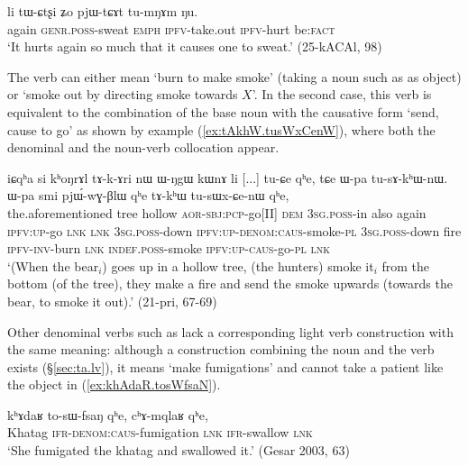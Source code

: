 \begin{exe}
\ex \label{ex:tWCtsxi.pjWtCAt}
 \gll  li tɯ-ɕtʂi ʑo pjɯ-tɕɤt tu-mŋɤm ŋu. \\
 again \textsc{genr}.\textsc{poss}-sweat \textsc{emph} \textsc{ipfv}-take.out \textsc{ipfv}-hurt be:\textsc{fact} \\
 \glt `It hurts again so much that it causes one to sweat.' (25-kACAl, 98)
\end{exe}
 
The verb  can either mean `burn to make smoke' (taking a noun such as  as object) or `smoke out by directing smoke towards $X$'. In the second case, this verb is equivalent to the combination of the base noun  with the causative form  `send, cause to go' as shown by example (\ref{ex:tAkhW.tusWxCenW}), where both the denominal  and the noun-verb collocation appear.

\begin{exe}
\ex \label{ex:tAkhW.tusWxCenW}
 \gll  iɕqʰa si kʰoŋrɤl tɤ-k-ɤri nɯ ɯ-ŋgɯ kɯnɤ li [...] tu-ɕe qʰe, tɕe ɯ-pa tu-sɤ-kʰɯ-nɯ. ɯ-pa smi pjɯ́-wɣ-βlɯ qʰe tɤ-kʰɯ tu-sɯx-ɕe-nɯ qʰe, \\
 the.aforementioned tree hollow \textsc{aor}-\textsc{sbj}:\textsc{pcp}-go[II] \textsc{dem} \textsc{3sg}.\textsc{poss}-in also again {  } \textsc{ipfv}:\textsc{up}-go \textsc{lnk} \textsc{lnk} \textsc{3sg}.\textsc{poss}-down \textsc{ipfv}:\textsc{up}-\textsc{denom}:\textsc{caus}-smoke-\textsc{pl} \textsc{3sg}.\textsc{poss}-down fire \textsc{ipfv}-\textsc{inv}-burn \textsc{lnk} \textsc{indef}.\textsc{poss}-smoke \textsc{ipfv}:\textsc{up}-\textsc{caus}-go-\textsc{pl} \textsc{lnk}  \\
\glt `(When the bear$_i$) goes up in a hollow tree, (the hunters) smoke it$_i$ from the bottom (of the tree), they make a fire and send the smoke upwards (towards the bear, to smoke it out).' (21-pri, 67-69)
\end{exe}

Other denominal verbs such as  lack a corresponding light verb construction with the same meaning: although a construction combining the noun   and the verb  exists (§\ref{sec:ta.lv}), it means `make fumigations' and cannot take a patient like the object  in (\ref{ex:khAdaR.tosWfsaN}).

\begin{exe}
\ex \label{ex:khAdaR.tosWfsaN}
 \gll kʰɤdaʁ to-sɯ-fsaŋ qʰe, cʰɤ-mqlaʁ qʰe, \\
 Khatag \textsc{ifr}-\textsc{denom}:\textsc{caus}-fumigation \textsc{lnk} \textsc{ifr}-swallow \textsc{lnk} \\
 \glt `She fumigated the khatag and swallowed it.' (Gesar 2003, 63)
\end{exe}

